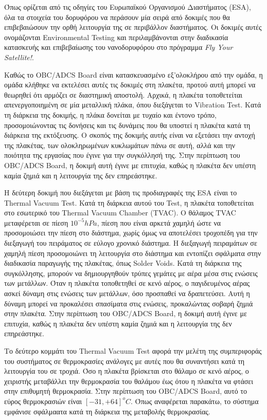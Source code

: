 \documentclass[a4paper,nobib,justified]{tufte-book}
\begin{document}
\par Όπως ορίζεται από τις οδηγίες του Ευρωπαϊκού Οργανισμού Διαστήματος (ESA), όλα τα στοιχεία του δορυφόρου να περάσουν μία σειρά από δοκιμές που θα επιβεβαιώσουν την ορθή λειτουργία της σε περιβάλλον διαστήματος. Οι δοκιμές αυτές ονομάζονται Environmental Testing και περιλαμβάνονται στην διαδικασία κατασκευής και επιβεβαίωσης του νανοδορυφόρου στο πρόγραμμα \textit{Fly Your Satellite!}.

Καθώς το OBC/ADCS Board είναι κατασκευασμένο εξ'ολοκλήρου από την ομάδα, η ομάδα κλήθηκε να εκτελέσει αυτές τις δοκιμές στη πλακέτα, προτού αυτή μπορεί να θεωρηθεί ότι αρμόζει σε διαστημική αποστολή. Αρχικά, η πλακέτα τοποθετείται απενεργοποιημένη σε μία μεταλλική πλάκα, όπου διεξάγεται το Vibration Test. Κατά τη διάρκεια της δοκιμής, η πλάκα δονείται με τυχαίο και έντονο τρόπο, προσομοιώνοντας τις δονήσεις και τις δυνάμεις που θα υποστεί η πλακέτα κατά τη διάρκεια της εκτόξευσης. Ο σκοπός της δοκιμής αυτής είναι να εξετάσει την αντοχή της πλακέτας, των ολοκληρωμένων κυκλωμάτων πάνω σε αυτή, αλλά και την ποιότητα της εργασίας που έγινε για την συγκόλλησή της. Στην περίπτωση του OBC/ADCS Board, η δοκιμή αυτή έγινε με επιτυχία, καθώς η πλακέτα δεν υπέστη καμία ζημιά και η λειτουργία της δεν επηρεάστηκε.

Η δεύτερη δοκιμή που διεξάγεται με βάση τις προδιαγραφές της ESA είναι το Thermal Vacuum Test. Κατά τη διάρκεια αυτού του Test, η πλακέτα τοποθετείται στο εσωτερικό του Thermal Vacuum Chamber (TVAC). Ο θάλαμος TVAC μεταφέρεται σε πίεση $10^{-5} hPa$, πίεση που είναι αρκετά χαμηλή ώστε να προσομοιώσει την πίεση στο διάστημα, χωρίς όμως να αποτελέσει τροχοπέδη για την διεξαγωγή του πειράματος σε εύλογο χρονικό διάστημα. Η διεξαγωγή πειραμάτων σε χαμηλή πίεση προσομοιώνει τη λειτουργία στο διάστημα και εντοπίζει σφάλματα στην διαδικασία παραγωγής της πλακέτας, όπως Solder Voids. Κατά τη διάρκεια της συγκόλλησης, μπορούν να δημιουργηθούν τρύπες γεμάτες με αέρα μέσα στις ενώσεις των μετάλλων. Όταν η πλακέτα τοποθετηθεί σε κενό αέρος, ο παγιδευμένος αέρας ασκεί δύναμη στις ενώσεις των μετάλλων, όσο προσπαθεί να δραπετεύσει. Αυτή η δύναμη μπορεί να προκαλέσει σπασίματα στις ενώσεις, προκαλώντας σοβαρή ζημιά στην πλακέτα. Στην περίπτωση του OBC/ADCS Board, η δοκιμή αυτή έγινε με επιτυχία, καθώς η πλακέτα δεν υπέστη καμία ζημιά και η λειτουργία της δεν επηρεάστηκε.

\par Το δεύτερο κομμάτι του Thermal Vacuum Test αφορά την μελέτη της συμπεριφοράς του συστήματος σε θερμοκρασίες ανάλογες με αυτές που θα συναντήσει κατά τη λειτουργία του σε τροχιά. Όσο η πλακέτα βρίσκεται στο θάλαμο σε κενό αέρος, ο χειριστής μεταβάλλει την θερμοκρασία του θαλάμου έως ότου η πλακέτα να φτάσει στην επιθυμητή θερμοκρασία. Στην περίπτωση του OBC/ADCS Board, αυτό το εύρος θερμοκρασιών είναι $[-31,+64] ^o C$. Όπως αναφέρεται παρακάτω, το σύστημα εμφάνισε σφάλμαατα κατά τη διάρκεια της μεταβολής θερμοκρασίας.
\end{document}
